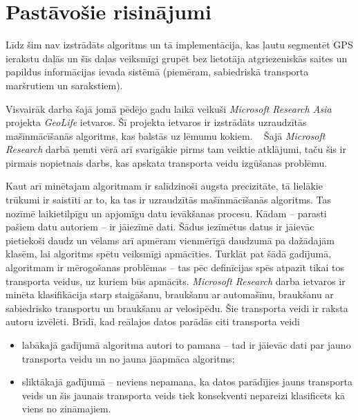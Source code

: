 \documentclass{ludis}
\begin{document}
\section{Pastāvošie risinājumi}
Līdz šim nav izstrādāts algoritms un tā implementācija, kas ļautu segmentēt GPS ierakstu daļās un 
šīs daļas veiksmīgi grupēt bez lietotāja atgriezeniskās saites un papildus informācijas ievada
sistēmā (piemēram, sabiedriskā transporta maršrutiem un sarakstiem).

Visvairāk darba šajā jomā pēdējo gadu laikā veikuši \emph{Microsoft Research Asia} projekta
\emph{GeoLife} ietvaros. Šī projekta ietvaros ir izstrādāts uzraudzītās mašīnmācīšanās 
algoritms, kas balstās uz lēmumu kokiem. ~\cite{zheng_gps_segmentation} Šajā \emph{Microsoft Research}
darbā ņemti vērā arī svarīgākie pirms tam veiktie atklājumi, taču šis ir pirmais nopietnais
darbs, kas apskata transporta veidu izgūšanas problēmu.

Kaut arī minētajam algoritmam ir salīdzinoši augsta precizitāte, tā lielākie trūkumi ir saistīti
ar to, ka tas ir uzraudzītās mašīnmācīšanās algoritms. Tas nozīmē laikietilpīgu un apjomīgu datu
ievākšanas procesu. Kādam -- parasti pašiem datu autoriem -- ir jāiezīmē dati. Šādus iezīmētus
datus ir jāievāc pietiekoši daudz un vēlams arī apmēram vienmērīgā daudzumā pa dažādajām klasēm,
lai algoritms spētu veiksmīgi apmācīties. Turklāt pat šādā gadījumā, algoritmam ir mērogošanas
problēmas -- tas pēc definīcijas spēs atpazīt tikai tos transporta veidus, uz kuriem būs
apmācīts. \emph{Microsoft Research} darba ietvaros ir minēta klasifikācija starp staigāšanu,
braukšanu ar automašīnu, braukšanu ar sabiedrisko transportu un braukšanu ar velosipēdu. Šie
transporta veidi ir raksta autoru izvēlēti. Brīdī, kad reālajos datos parādās citi transporta
veidi
\begin{itemize}
\item labākajā gadījumā algoritma autori to pamana -- tad ir jāievāc dati par jauno transporta
  veidu un no jauna jāapmāca algoritms;
\item sliktākajā gadījumā -- neviens nepamana, ka datos parādījies jauns transporta veids un šis
  jaunais transporta veids tiek konsekventi nepareizi klasificēts kā viens no zināmajiem.
\end{itemize}
\end{document}

